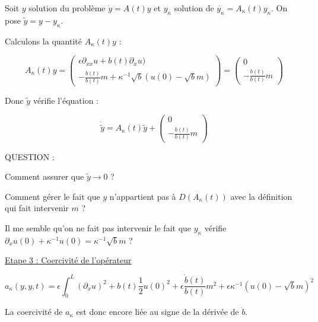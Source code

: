 \documentclass[a4paper]{article}
\newcommand{\dep}{b}
\newcommand{\Ak}{A_{\kappa}}
\newcommand{\yk}{y_{\kappa}}
\begin{document}
Soit $y$ solution du problème $\dot{y}=A(t)y$ 
et $\yk$ solution de $\dot{\yk} = \Ak(t) \yk$.
On pose $\tilde{y}= y-\yk $. 

Calculons la quantité $\Ak(t) y$ :

\[
\Ak(t) y =  
\left(\begin{array}{c}
 \epsilon \partial_{xx} u +\dep (t)\partial_xu )\\
- \displaystyle \frac{\dot{\dep}(t)}{\dep(t)}m 
+ \kappa^{-1}\sqrt{\dep}(u(0)-\sqrt{\dep}m)
 \end{array}\right) 
 =
 \left(\begin{array}{c}
 0 \\
 - \displaystyle \frac{\dot{\dep}(t)}{\dep(t)}m 
  \end{array}\right) 
\]

Donc $\tilde{y}$ vérifie l'équation :

\[ \dot{\tilde{y}} = \Ak(t) \tilde{y} 
                  + \left(\begin{array}{c}
                         0 \\
                         - \displaystyle \frac{\dot{\dep}(t)}{\dep(t)} m 
                       \end{array}\right)
\]


QUESTION :

Comment assurer que $\tilde{y} \rightarrow 0$ ?

Comment gérer le fait que $y$ n'appartient pas à $D(\Ak (t))$ avec la définition qui fait intervenir $m$ ?

Il me semble qu'on ne fait pas intervenir le fait que $\yk$ vérifie $\partial_xu(0) + \kappa^{-1} u(0) = \kappa^{-1} \sqrt{\dep}m$ ?



\vspace{0.3cm}
\underline{Etape 3 : Coercivité de l'opérateur}

\[
\displaystyle a_\kappa(y,y,t) = \epsilon \int_0^L (\partial_xu)^2 
  		            + \dep (t) \frac{1}{2}u(0)^2
                    + \epsilon  \frac{\dot{\dep}(t)}{\dep(t)}m^2
				    + \epsilon \kappa^{-1}(u(0)-\sqrt{\dep}m)^2
\]

La coercivité de $a_\kappa$ est donc encore liée au signe de la dérivée de $\dot{b}$.


                            


\newpage

\medskip


	
\end{document}
